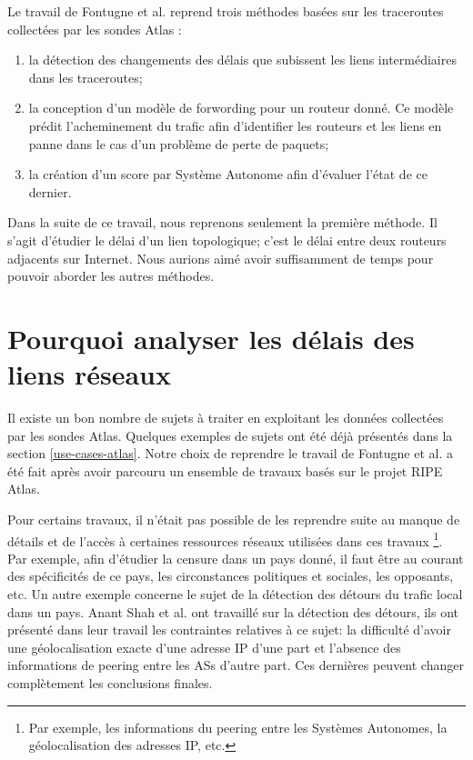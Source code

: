 Le travail de  Fontugne et al. \cite{DBLP:journals/corr/FontugneAPB16} reprend trois méthodes basées sur les traceroutes collectées par les sondes Atlas :

\begin{enumerate}
	\item la détection des changements des délais que subissent les liens intermédiaires dans les traceroutes; 
	
	\item la conception d'un modèle de forwording pour un routeur donné. Ce modèle  prédit l'acheminement du trafic afin d'identifier les routeurs  et les liens en panne dans le cas  d'un problème  de perte de paquets;
	
	\item la création d'un score par Système Autonome afin d'évaluer l'état de ce dernier.
	
\end{enumerate}

Dans la suite de ce travail, nous  reprenons seulement la première méthode.  Il s'agit d'étudier le délai d'un lien topologique; c'est le délai entre deux routeurs adjacents sur Internet. Nous aurions aimé avoir suffisamment de temps pour pouvoir aborder les autres méthodes.  



\section{Pourquoi analyser les délais des liens réseaux}

Il existe un bon nombre de sujets à traiter en exploitant les données collectées par les sondes Atlas. Quelques exemples de sujets ont été déjà présentés dans la section \ref{use-cases-atlas}. Notre choix de reprendre le travail de Fontugne et al. \cite{DBLP:journals/corr/FontugneAPB16} a été fait après avoir parcouru un ensemble de travaux basés sur le projet  RIPE Atlas. 

Pour certains travaux, il n'était pas possible  de les reprendre suite au manque de détails et de l'accès à  certaines ressources réseaux utilisées dans ces travaux \footnote{Par exemple, les informations du peering entre les Systèmes Autonomes, la géolocalisation des adresses IP, etc.}. Par exemple, afin d'étudier la censure dans un pays donné, il faut être au courant des spécificités de ce pays, les circonstances politiques et sociales, les opposants,  etc.  Un autre exemple concerne le sujet de la détection des détours du trafic local dans un pays.  Anant Shah  et al. ont travaillé sur la détection des détours, ils ont présenté dans leur travail \cite{anant-shah} les contraintes relatives à ce sujet: la difficulté d'avoir une géolocalisation exacte d'une adresse IP d'une part et l'absence des informations de peering entre les ASs d'autre part. Ces dernières peuvent changer complètement les conclusions finales. 

